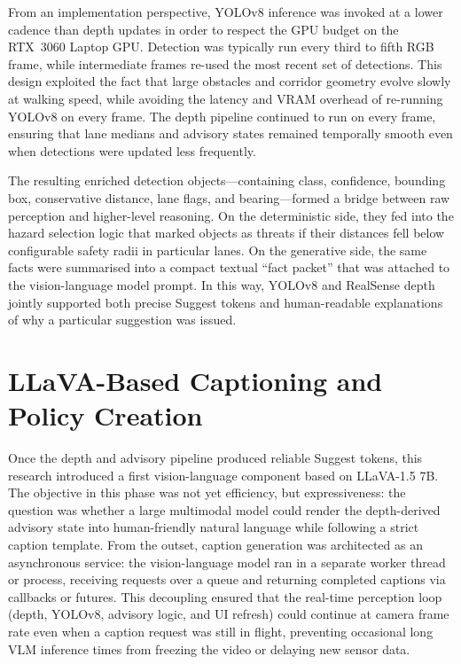 \documentclass[11pt,a4paper]{article}
\begin{document}
From an implementation perspective, YOLOv8 inference was invoked at a lower cadence than depth updates in order to respect the GPU budget on the RTX~3060 Laptop GPU. Detection was typically run every third to fifth RGB frame, while intermediate frames re-used the most recent set of detections. This design exploited the fact that large obstacles and corridor geometry evolve slowly at walking speed, while avoiding the latency and VRAM overhead of re-running YOLOv8 on every frame. The depth pipeline continued to run on every frame, ensuring that lane medians and advisory states remained temporally smooth even when detections were updated less frequently.

The resulting enriched detection objects---containing class, confidence, bounding box, conservative distance, lane flags, and bearing---formed a bridge between raw perception and higher-level reasoning. On the deterministic side, they fed into the hazard selection logic that marked objects as threats if their distances fell below configurable safety radii in particular lanes. On the generative side, the same facts were summarised into a compact textual ``fact packet'' that was attached to the vision-language model prompt. In this way, YOLOv8 and RealSense depth jointly supported both precise Suggest tokens and human-readable explanations of why a particular suggestion was issued.

\section{LLaVA-Based Captioning and Policy Creation}

Once the depth and advisory pipeline produced reliable Suggest tokens, this research introduced a first vision-language component based on LLaVA-1.5 7B. The objective in this phase was not yet efficiency, but expressiveness: the question was whether a large multimodal model could render the depth-derived advisory state into human-friendly natural language while following a strict caption template. From the outset, caption generation was architected as an asynchronous service: the vision-language model ran in a separate worker thread or process, receiving requests over a queue and returning completed captions via callbacks or futures. This decoupling ensured that the real-time perception loop (depth, YOLOv8, advisory logic, and UI refresh) could continue at camera frame rate even when a caption request was still in flight, preventing occasional long VLM inference times from freezing the video or delaying new sensor data.
\end{document}
